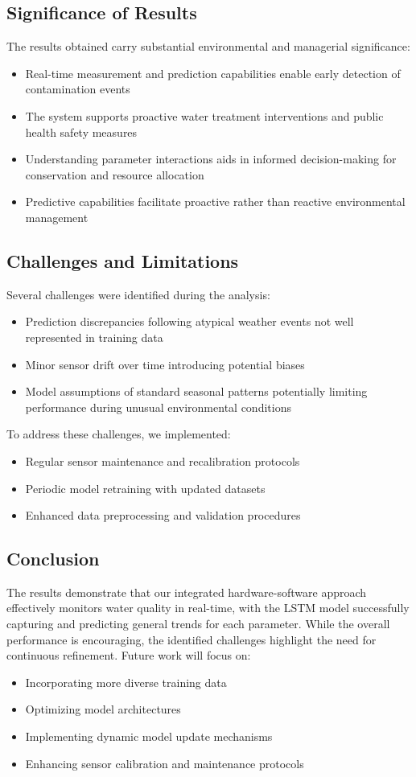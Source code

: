 \documentclass[conference]{IEEEtran}
\begin{document}
\subsection{Significance of Results}
The results obtained carry substantial environmental and managerial significance:
\begin{itemize}
\item Real-time measurement and prediction capabilities enable early detection of contamination events
\item The system supports proactive water treatment interventions and public health safety measures
\item Understanding parameter interactions aids in informed decision-making for conservation and resource allocation
\item Predictive capabilities facilitate proactive rather than reactive environmental management
\end{itemize}

\subsection{Challenges and Limitations}
Several challenges were identified during the analysis:
\begin{itemize}
\item Prediction discrepancies following atypical weather events not well represented in training data
\item Minor sensor drift over time introducing potential biases
\item Model assumptions of standard seasonal patterns potentially limiting performance during unusual environmental conditions
\end{itemize}

To address these challenges, we implemented:
\begin{itemize}
\item Regular sensor maintenance and recalibration protocols
\item Periodic model retraining with updated datasets
\item Enhanced data preprocessing and validation procedures
\end{itemize}

\subsection{Conclusion}
The results demonstrate that our integrated hardware-software approach effectively monitors water quality in real-time, with the LSTM model successfully capturing and predicting general trends for each parameter. While the overall performance is encouraging, the identified challenges highlight the need for continuous refinement. Future work will focus on:
\begin{itemize}
\item Incorporating more diverse training data
\item Optimizing model architectures
\item Implementing dynamic model update mechanisms
\item Enhancing sensor calibration and maintenance protocols
\end{itemize}
\end{document}
